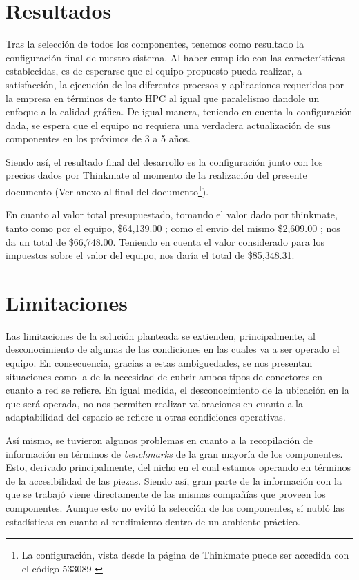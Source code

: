 \documentclass[conference,onecolumn]{IEEEtran}
\begin{document}
\section{Resultados}
Tras la selección de todos los componentes, tenemos como resultado la configuración final de nuestro sistema. Al haber cumplido con las características establecidas, es de esperarse que el equipo propuesto pueda realizar, a satisfacción, la ejecución de los diferentes procesos y aplicaciones requeridos por la empresa en términos de tanto HPC al igual que paralelismo dandole un enfoque a la calidad gráfica. De igual manera, teniendo en cuenta la configuración dada, se espera que el equipo no requiera una verdadera actualización de sus componentes en los próximos de 3 a 5 años. \medbreak

Siendo así, el resultado final del desarrollo es la configuración junto con los precios dados por Thinkmate al momento de la realización del presente documento (Ver anexo al final del documento\footnote{La configuración, vista desde la página de Thinkmate puede ser accedida con el código 533089 \cite{thinkmateConf}}). \medbreak

En cuanto al valor total presupuestado, tomando el valor dado por thinkmate, tanto como por el equipo, \$64,139.{\small00} \cite{thinkmateConf}; como el envio del mismo \$2,609.{\small00} \cite{thinkmateHP}; nos da un total de \$66,748.{\small00}. Teniendo en cuenta el valor considerado para los impuestos sobre el valor del equipo, nos daría el total de \$85,348.{\small31}. 

\section{Limitaciones}
Las limitaciones de la solución planteada se extienden, principalmente, al desconocimiento de algunas de las condiciones en las cuales va a ser operado el equipo. En consecuencia, gracias a estas ambiguedades, se nos presentan situaciones como la de la necesidad de cubrir ambos tipos de conectores en cuanto a red se refiere. En igual medida, el desconocimiento de la ubicación en la que será operada, no nos permiten realizar valoraciones en cuanto a la adaptabilidad del espacio se refiere u otras condiciones operativas. \medbreak

Así mismo, se tuvieron algunos problemas en cuanto a la recopilación de información en términos de \textit{benchmarks} de la gran mayoría de los componentes. Esto, derivado principalmente, del nicho en el cual estamos operando en términos de la accesibilidad de las piezas. Siendo así, gran parte de la información con la que se trabajó viene directamente de las mismas compañías que proveen los componentes. Aunque esto no evitó la selección de los componentes, sí nubló las estadísticas en cuanto al rendimiento dentro de un ambiente práctico.
\end{document}
